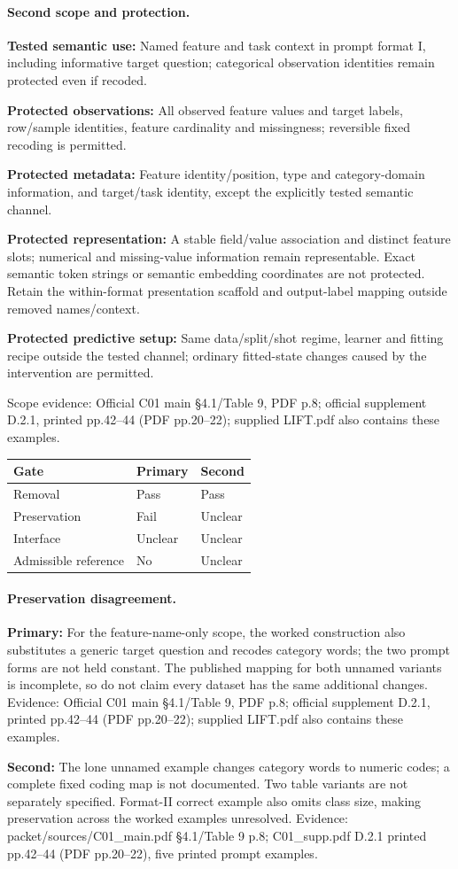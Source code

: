 \documentclass[10pt]{article}
\begin{document}
\paragraph{Second scope and protection.}
\textbf{Tested semantic use:} Named feature and task context in prompt format I, including informative target question; categorical observation identities remain protected even if recoded.\par
\textbf{Protected observations:} All observed feature values and target labels, row/sample identities, feature cardinality and missingness; reversible fixed recoding is permitted.\par
\textbf{Protected metadata:} Feature identity/position, type and category-domain information, and target/task identity, except the explicitly tested semantic channel.\par
\textbf{Protected representation:} A stable field/value association and distinct feature slots; numerical and missing-value information remain representable. Exact semantic token strings or semantic embedding coordinates are not protected. Retain the within-format presentation scaffold and output-label mapping outside removed names/context.\par
\textbf{Protected predictive setup:} Same data/split/shot regime, learner and fitting recipe outside the tested channel; ordinary fitted-state changes caused by the intervention are permitted.\par
Scope evidence: Official C01 main §4.1/Table 9, PDF p.8; official supplement D.2.1, printed pp.42--44 (PDF pp.20--22); supplied LIFT.pdf also contains these examples.\par
\begin{tabular}{lll}\toprule Gate & Primary & Second \\ \midrule
Removal & Pass & Pass \\
Preservation & Fail & Unclear \\
Interface & Unclear & Unclear \\
Admissible reference & No & Unclear \\
\bottomrule\end{tabular}
\paragraph{Preservation disagreement.}
\textbf{Primary:} For the feature-name-only scope, the worked construction also substitutes a generic target question and recodes category words; the two prompt forms are not held constant. The published mapping for both unnamed variants is incomplete, so do not claim every dataset has the same additional changes. Evidence: Official C01 main §4.1/Table 9, PDF p.8; official supplement D.2.1, printed pp.42--44 (PDF pp.20--22); supplied LIFT.pdf also contains these examples.\par
\textbf{Second:} The lone unnamed example changes category words to numeric codes; a complete fixed coding map is not documented. Two table variants are not separately specified. Format-II correct example also omits class size, making preservation across the worked examples unresolved. Evidence: packet/sources/C01\_main.pdf §4.1/Table 9 p.8; C01\_supp.pdf D.2.1 printed pp.42--44 (PDF pp.20--22), five printed prompt examples.\par
\end{document}
